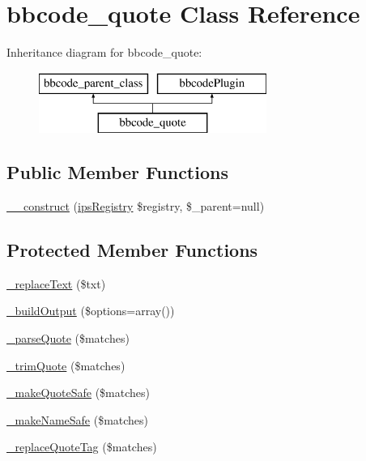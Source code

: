 \hypertarget{classbbcode__quote}{\section{bbcode\-\_\-quote Class Reference}
\label{classbbcode__quote}
}
Inheritance diagram for bbcode\-\_\-quote\-:\begin{figure}[H]
\begin{center}
\leavevmode
\includegraphics[height=2.000000cm]{classbbcode__quote}
\end{center}
\end{figure}
\subsection*{Public Member Functions}
\begin{DoxyCompactItemize}
\item 
\hyperlink{classbbcode__quote_a9c7a683aed4631ab88876012e950f1ab}{\-\_\-\-\_\-construct} (\hyperlink{classips_registry}{ips\-Registry} \$registry, \$\-\_\-parent=null)
\end{DoxyCompactItemize}
\subsection*{Protected Member Functions}
\begin{DoxyCompactItemize}
\item 
\hyperlink{classbbcode__quote_a5001c42193db0c30308d9a3f17ccd950}{\-\_\-replace\-Text} (\$txt)
\item 
\hyperlink{classbbcode__quote_a4f2f0801522e418a8d5557ad1f8c6d2e}{\-\_\-build\-Output} (\$options=array())
\item 
\hyperlink{classbbcode__quote_a108bffb6ee1a2f2f03ef7d1e01d8384a}{\-\_\-parse\-Quote} (\$matches)
\item 
\hyperlink{classbbcode__quote_a7a5dfa74e78a2b28cf618a138bb7a2cb}{\-\_\-trim\-Quote} (\$matches)
\item 
\hyperlink{classbbcode__quote_a939d39fb089bcae154f2f7da0de7685b}{\-\_\-make\-Quote\-Safe} (\$matches)
\item 
\hyperlink{classbbcode__quote_a24280bbabf344e6d3b3db38e6247e33a}{\-\_\-make\-Name\-Safe} (\$matches)
\item 
\hyperlink{classbbcode__quote_a76a4a2edadc65d0447390038d8dbfa86}{\-\_\-replace\-Quote\-Tag} (\$matches)
\end{DoxyCompactItemize}

